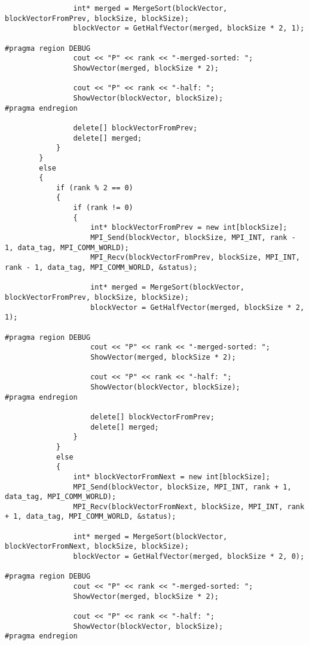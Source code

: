 \documentclass[a4paper,14pt]{extarticle}
\begin{document}
\begin{lstlisting}
                int* merged = MergeSort(blockVector, blockVectorFromPrev, blockSize, blockSize);
                blockVector = GetHalfVector(merged, blockSize * 2, 1);

#pragma region DEBUG
                cout << "P" << rank << "-merged-sorted: ";
                ShowVector(merged, blockSize * 2);

                cout << "P" << rank << "-half: ";
                ShowVector(blockVector, blockSize);
#pragma endregion

                delete[] blockVectorFromPrev;
                delete[] merged;
            }
        }
        else 
        {
            if (rank % 2 == 0) 
            {
                if (rank != 0) 
                {
                    int* blockVectorFromPrev = new int[blockSize];
                    MPI_Send(blockVector, blockSize, MPI_INT, rank - 1, data_tag, MPI_COMM_WORLD);
                    MPI_Recv(blockVectorFromPrev, blockSize, MPI_INT, rank - 1, data_tag, MPI_COMM_WORLD, &status);

                    int* merged = MergeSort(blockVector, blockVectorFromPrev, blockSize, blockSize);
                    blockVector = GetHalfVector(merged, blockSize * 2, 1);

#pragma region DEBUG
                    cout << "P" << rank << "-merged-sorted: ";
                    ShowVector(merged, blockSize * 2);

                    cout << "P" << rank << "-half: ";
                    ShowVector(blockVector, blockSize);
#pragma endregion

                    delete[] blockVectorFromPrev;
                    delete[] merged;
                }
            }
            else 
            {
                int* blockVectorFromNext = new int[blockSize];
                MPI_Send(blockVector, blockSize, MPI_INT, rank + 1, data_tag, MPI_COMM_WORLD);
                MPI_Recv(blockVectorFromNext, blockSize, MPI_INT, rank + 1, data_tag, MPI_COMM_WORLD, &status);

                int* merged = MergeSort(blockVector, blockVectorFromNext, blockSize, blockSize);
                blockVector = GetHalfVector(merged, blockSize * 2, 0);

#pragma region DEBUG
                cout << "P" << rank << "-merged-sorted: ";
                ShowVector(merged, blockSize * 2);

                cout << "P" << rank << "-half: ";
                ShowVector(blockVector, blockSize);
#pragma endregion


\end{lstlisting}
\end{document}
